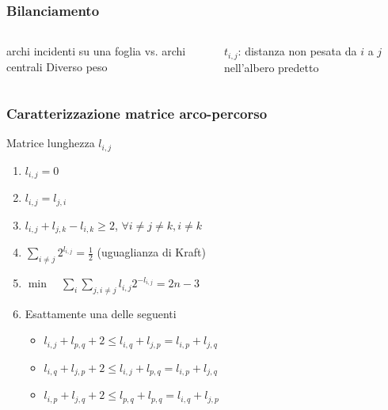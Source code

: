 \begin{frame}
    \frametitle{Bilanciamento}
    \begin{columns}
        \begin{column}{0.48\textwidth}
            \begin{block}{archi incidenti su una foglia vs.
                    archi centrali}
                Diverso peso
            \end{block}
        \end{column}
        \begin{column}{0.48\textwidth}

            $t_{i,j}$: distanza non pesata da $i$ a $j$ nell'albero predetto

        \end{column}
    \end{columns}
\end{frame}

\begin{frame}
    \frametitle{Caratterizzazione matrice arco-percorso}
    \begin{block}{Matrice lunghezza $l_{i,j}$}
        \begin{enumerate}
            \item $l_{i,j} = 0$
            \item $l_{i,j} = l_{j,i}$
            \item $l_{i,j} + l_{j,k} - l_{i,k} \geq  2$, $\forall i\ne j\ne k, i\neq k$
            \item $\sum_{i\ne j} 2^{l_{i,j}} = \frac{1}{2}$ \hspace{1em}(uguaglianza di Kraft)
            \item     $\min\quad \sum_{i} \sum_{j, i\ne j} l_{i,j} 2^{- l_{i,j}} = 2n -3$
            \item Esattamente una delle seguenti
                  \begin{itemize}
                      \item $l_{i,j} + l_{p,q} + 2 \le l_{i,q} + l_{{j,p}}  = l_{i,p} + l_{{j,q}} $
                      \item $l_{i,q} + l_{j,p} + 2 \le l_{i,j} + l_{{p,q}}  = l_{i,p} + l_{{j,q}} $
                      \item $l_{i,p} + l_{j,q} + 2 \le l_{p,q} + l_{{p,q}}  = l_{i,q} + l_{{j,p}} $
                  \end{itemize}
        \end{enumerate}
    \end{block}
\end{frame}

